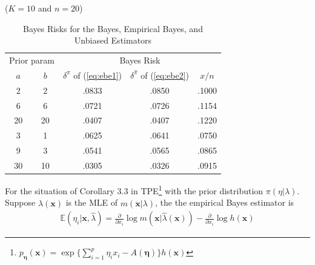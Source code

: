 \begin{table}[htbp]
  \centering
  \caption{Bayes Risks for the Bayes, Empirical Bayes, and Unbiased Estimators}
  ($K = 10$ and $n = 20$)\\
    \begin{tabular}{ccccc}
    \toprule
    \multicolumn{2}{c}{Prior param} & \multicolumn{3}{c}{Bayes Risk} \\
    $a$     & $b$     & $\delta^\pi$ of (\ref{eq:ebe1}) & $\delta^{\hat{\pi}}$ of (\ref{eq:ebe2}) & $x/n$ \\
    \midrule
    2     & 2     & .0833 & .0850 & .1000 \\
    6     & 6     & .0721 & .0726 & .1154 \\
    20    & 20    & .0407 & .0407 & .1220 \\
    3     & 1     & .0625 & .0641 & .0750 \\
    9     & 3     & .0541 & .0565 & .0865 \\
    30    & 10    & .0305 & .0326 & .0915 \\
    \bottomrule
    \end{tabular}%
  \label{tab:ebe}%
\end{table}%


\begin{theorem}
    For the situation of Corollary 3.3 in TPE\footnote{
    $p_{\boldsymbol{\eta}}(\boldsymbol{x})=\exp\{\sum_{i=1}^p{\eta_ix_i}-A(\boldsymbol{\eta})\}h(\boldsymbol{x})$
    } with the prior distribution $\pi(\eta|\lambda)$.
    Suppose $\hat{\lambda}(\boldsymbol{x})$ is the MLE of $m(\boldsymbol{x}|\lambda)$,
    the the empirical Bayes estimator is 
    \begin{gather}
        \mathbb{E}(\eta_i|\boldsymbol{x},\hat{\lambda})
        =\frac{\partial}{\partial{x_i}}\log{m(\boldsymbol{x}|\hat{\lambda}(\boldsymbol{x}))}
        -\frac{\partial}{\partial{x_i}}\log{h(\boldsymbol{x})}
    \end{gather}
\end{theorem}

